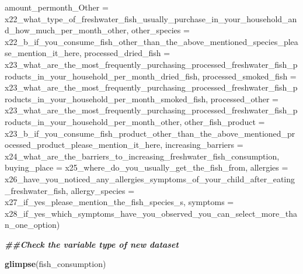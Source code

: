 \documentclass[
]{article}
\newenvironment{Shaded}{\begin{snugshade}}{\end{snugshade}}
\newcommand{\AttributeTok}[1]{\textcolor[rgb]{0.13,0.29,0.53}{#1}}
\newcommand{\DocumentationTok}[1]{\textcolor[rgb]{0.56,0.35,0.01}{\textbf{\textit{#1}}}}
\newcommand{\FunctionTok}[1]{\textcolor[rgb]{0.13,0.29,0.53}{\textbf{#1}}}
\newcommand{\NormalTok}[1]{#1}
\begin{document}
\begin{Shaded}
\begin{Highlighting}[]
       \AttributeTok{amount\_permonth\_Other =}\NormalTok{ x22\_what\_type\_of\_freshwater\_fish\_usually\_purchase\_in\_your\_household\_and\_how\_much\_per\_month\_other,}
       \AttributeTok{other\_species =}\NormalTok{ x22\_b\_if\_you\_consume\_fish\_other\_than\_the\_above\_mentioned\_species\_please\_mention\_it\_here,}
       \AttributeTok{processed\_dried\_fish =}\NormalTok{ x23\_what\_are\_the\_most\_frequently\_purchasing\_processed\_freshwater\_fish\_products\_in\_your\_household\_per\_month\_dried\_fish,}
       \AttributeTok{processed\_smoked\_fish =}\NormalTok{ x23\_what\_are\_the\_most\_frequently\_purchasing\_processed\_freshwater\_fish\_products\_in\_your\_household\_per\_month\_smoked\_fish,}
       \AttributeTok{processed\_other =}\NormalTok{ x23\_what\_are\_the\_most\_frequently\_purchasing\_processed\_freshwater\_fish\_products\_in\_your\_household\_per\_month\_other,}
       \AttributeTok{other\_fish\_product =}\NormalTok{ x23\_b\_if\_you\_consume\_fish\_product\_other\_than\_the\_above\_mentioned\_processed\_product\_please\_mention\_it\_here,}
       \AttributeTok{increasing\_barriers =}\NormalTok{ x24\_what\_are\_the\_barriers\_to\_increasing\_freshwater\_fish\_consumption,}
       \AttributeTok{buying\_place =}\NormalTok{ x25\_where\_do\_you\_usually\_get\_the\_fish\_from,}
       \AttributeTok{allergies =}\NormalTok{ x26\_have\_you\_noticed\_any\_allergies\_symptoms\_of\_your\_child\_after\_eating\_freshwater\_fish,}
       \AttributeTok{allergy\_species =}\NormalTok{ x27\_if\_yes\_please\_mention\_the\_fish\_species\_s,}
       \AttributeTok{symptoms =}\NormalTok{ x28\_if\_yes\_which\_symptoms\_have\_you\_observed\_you\_can\_select\_more\_than\_one\_option)}
      

\DocumentationTok{\#\#Check the variable type of new dataset}

\FunctionTok{glimpse}\NormalTok{(fish\_consumption)}
\end{Highlighting}
\end{Shaded}
\end{document}
